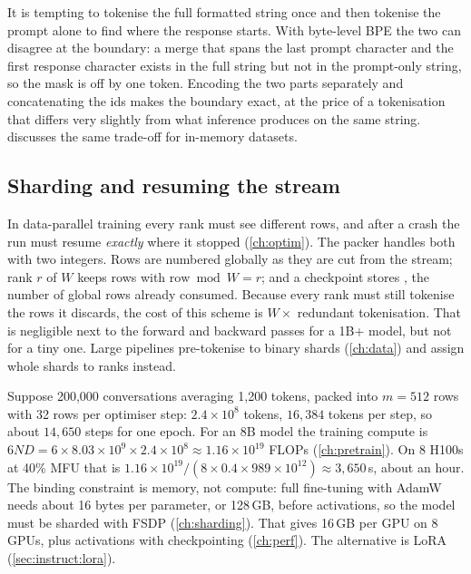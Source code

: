 \begin{pitfall}
It is tempting to tokenise the full formatted string once and then tokenise the prompt alone to
find where the response starts. With byte-level BPE the two can disagree at the boundary: a
merge that spans the last prompt character and the first response character exists in the
full string but not in the prompt-only string, so the mask is off by one token. Encoding the
two parts separately and concatenating the ids makes the boundary exact, at the price of a
tokenisation that differs very slightly from what inference produces on the same string.
 discusses the same trade-off for in-memory datasets.
\end{pitfall}

\subsection{Sharding and resuming the stream}

In data-parallel training every rank must see different rows, and after a crash the run must
resume \emph{exactly} where it stopped (\cref{ch:optim}). The packer handles both with two
integers. Rows are numbered globally as they are cut from the stream; rank $r$ of $W$ keeps
rows with $\text{row}\bmod W=r$; and a checkpoint stores , the number of global
rows already consumed. Because every rank must still tokenise the rows it discards, the cost of
this scheme is $W\times$ redundant tokenisation. That is negligible next to the forward and
backward passes for a 1B+ model, but not for a tiny one. Large pipelines pre-tokenise to binary shards
(\cref{ch:data}) and assign whole shards to ranks instead.

\begin{systemslens}
Suppose 200{,}000 conversations averaging 1{,}200 tokens, packed into $m=512$ rows with
32 rows per optimiser step: $2.4\times10^8$ tokens, $16{,}384$ tokens per step, so about
$14{,}650$ steps for one epoch. For an 8B model the training compute is
$6ND = 6\times 8.03\times10^9\times2.4\times10^8 \approx 1.16\times10^{19}$ FLOPs
(\cref{ch:pretrain}). On 8 H100s at 40\% MFU that is
$1.16\times10^{19}/(8\times0.4\times989\times10^{12})\approx 3{,}650$\,s, about an hour. The binding
constraint is memory, not compute: full fine-tuning with AdamW needs about 16 bytes per
parameter, or 128\,GB, before activations, so the model must be sharded with FSDP
(\cref{ch:sharding}). That gives 16\,GB per GPU on 8 GPUs, plus activations with checkpointing
(\cref{ch:perf}). The alternative is LoRA (\cref{sec:instruct:lora}).
\end{systemslens}

